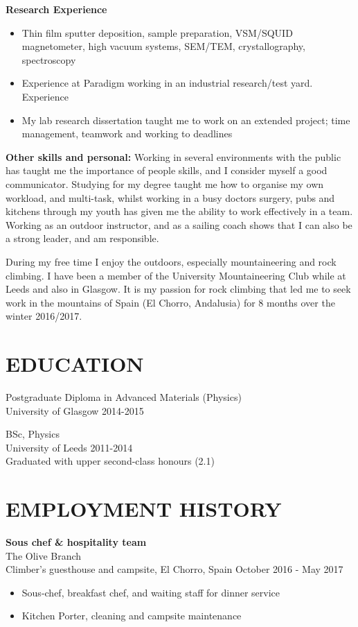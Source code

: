 \documentclass[margin, line, 10pt]{res} %
\begin{document}
\begin{resume}
\textbf{Research Experience} 
\begin{itemize}
\item Thin film sputter deposition, sample preparation, VSM/SQUID magnetometer, high vacuum systems, SEM/TEM, crystallography, spectroscopy


\item Experience at Paradigm working in an industrial research/test yard. Experience  

\item My lab research dissertation taught me to work on an extended project; time management, teamwork and working to deadlines
\end{itemize}

\textbf{Other skills and personal:}
Working in several environments with the public has taught me the importance of  people skills, and I consider myself a good communicator. Studying for my degree taught me how to organise my own workload, and multi-task, whilst working in a busy doctors surgery, pubs and kitchens through my youth has given me the ability to work effectively in a team. Working as an outdoor instructor, and as a sailing coach shows that I can also be a strong leader, and am responsible.\

During my free time I enjoy the outdoors, especially mountaineering and rock climbing. I have been a member of the University Mountaineering Club while at Leeds and also in Glasgow. It is my passion for rock climbing that led me to seek work in the mountains of Spain (El Chorro, Andalusia) for 8 months over the winter 2016/2017.

\section{EDUCATION}

Postgraduate Diploma in Advanced Materials (Physics)\\
University of Glasgow 2014-2015 \

BSc, Physics \\
University of Leeds 2011-2014 \\
Graduated with upper second-class honours (2.1) 

\section{EMPLOYMENT HISTORY}

\textbf{Sous chef \& hospitality team} \\
The Olive Branch\\
Climber's guesthouse and campsite, El Chorro, Spain \hfill October 2016 - May 2017\\
\begin{itemize} \itemsep -2pt %
\item Sous-chef, breakfast chef, and waiting staff for dinner service 
\item Kitchen Porter, cleaning and campsite maintenance
\end{itemize}




\end{resume}
\end{document}

